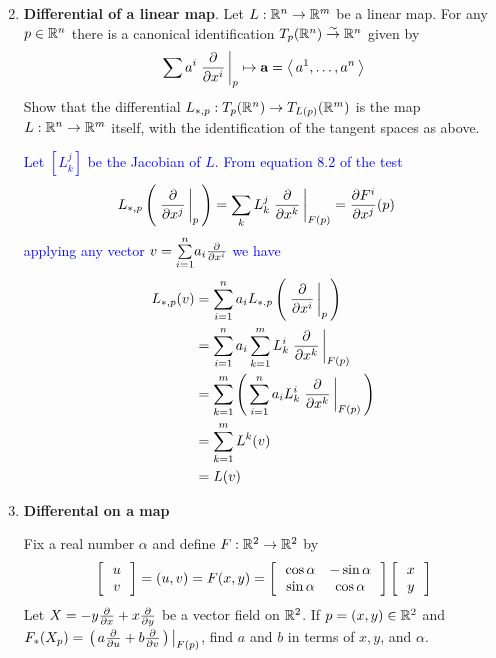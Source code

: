 \documentclass[10pt,a4paper]{report}
\newcommand{\BLUE}[1]{\textcolor{blue}{#1}}
\begin{document}
\begin{enumerate}[label=8.\arabic*.]
\setcounter{enumi}{1}
	\item \textbf{Differential of a linear map}.  Let $L : \mathbb{R}^n \to \mathbb{R}^m$ be a linear map.  For any $p\in \mathbb{R}^n$ there is a canonical identification $T_p(\mathbb{R}^n) \overset{\sim}\to\mathbb{R}^n$ given by 
	\begin{align*}
		\sum a^i \left . \frac{\partial }{\partial x^i} \, \right |_p \mapsto \textbf{a} = \left \langle\, a^1, \dots, a^n \,\right \rangle
	\end{align*}Show that the differential $L_{*,p}: T_p(\mathbb{R}^n) \to T_{L(p)}(\mathbb{R}^m)$ is the map $L: \mathbb{R}^n \to \mathbb{R}^m$ itself, with the identification of the tangent spaces as above.
	
	\BLUE{Let $[L_k^j]$ be the Jacobian of $L$.  From equation 8.2 of the test \begin{align*}
		L_{*,p}\left (\, \left . \frac{\partial }{\partial x^j} \, \right |_p \,\right ) &= \sum_{k} L_k^j\left . \frac{\partial }{\partial x^k} \, \right |_{F(p)}  = \frac{\partial F^i}{\partial x^j}(p)		
	\end{align*}applying any vector $v = \underset{i=1}{\overset{n}{\sum}} a_i \frac{\partial }{\partial x^i}$ we have
	\begin{align*}
	 	L_{*,p}(v) &= \sum_{i=1}^n a_i L_{*.p}\left (\, \left .  \frac{\partial }{\partial x^i} \, \right |_p \,\right ) \\
	 	&= \sum_{i=1}^n a_i \sum_{k=1}^m L_k^i\left . \frac{\partial }{\partial x^k} \, \right |_{F(p)}  \\
	 	&= \sum_{k=1}^m \left (\,  \sum_{i=1}^n a_i L_k^i\left . \frac{\partial }{\partial x^k} \, \right |_{F(p)} \,\right )  \\
	 	&= \sum_{k=1}^m L^k(v) \\
	 	&= L(v)
	\end{align*}
	}
	
	\item \textbf{Differental on a map}
	
	Fix a real number $\alpha$ and define $F: \mathbb{R}^2\to \mathbb{R}^2$ by 
	\begin{align*}
		\left [\, \begin{array}{c}
		u \\v
		\end{array}
		 \,\right ] = (u,v) = F(x,y) = \left [\, \begin{array}{cc}
		\cos \alpha & -\sin \alpha \\
		\sin \alpha & \cos \alpha		
		\end{array}
		 \,\right ]\left [\, \begin{array}{c}
		x \\y		
		\end{array}
		 \,\right ]
	\end{align*}Let $X = -y\frac{\partial }{\partial x}+x\frac{\partial }{\partial y}$ be a vector field on $\mathbb{R}^2$.  If $p = (x,y) \in \mathbb{R}^2$ and $F_*(X_p)=\left . \left (\, a\frac{\partial }{\partial u}+ b\frac{\partial }{\partial v} \,\right ) \, \right |_{F(p)}$, find $a$ and $b$ in terms of $x,y$, and $\alpha$.
	

\end{enumerate}
\end{document}
